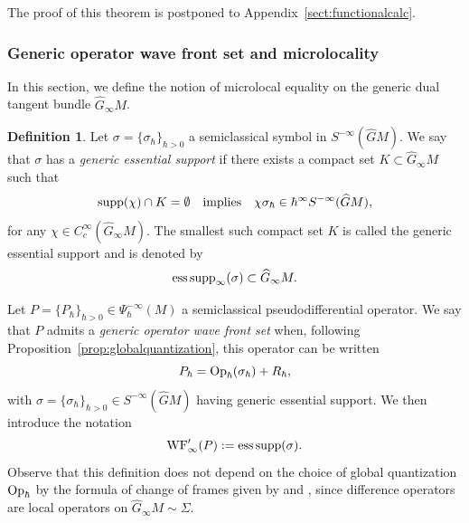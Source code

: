 \documentclass[12pt,a4paper]{amsart}
\theoremstyle{plain}
\theoremstyle{definition}
\newtheorem{definition}[theorem]{Definition}
\theoremstyle{remark}
\numberwithin{equation}{section}
\theoremstyle{definition}
\def \Op{{\rm Op}}
\def \Ghat{\widehat{G}}
\numberwithin{equation}{section}
\begin{document}
The proof of this theorem is postponed to Appendix~\ref{sect:functionalcalc}.

\subsubsection{Generic operator wave front set and microlocality}
\label{subsubsect:wavefrontset}

In this section, we define the notion of microlocal equality on the generic dual tangent bundle $\Ghat_\infty M$.

\begin{definition}
    \label{def:esssup}
    Let $\sigma = \{\sigma_\hbar\}_{\hbar>0}$ a semiclassical symbol in $S^{-\infty}(\Ghat M)$. We say that $\sigma$ has a \emph{generic essential support} if there exists a compact set $K\subset \Ghat_\infty M$ such that
    \begin{equation*}
        {\rm supp}(\chi)\cap K = \emptyset\quad\mbox{implies}\quad\chi\sigma_\hbar\in\hbar^\infty S^{-\infty}(\Ghat M),
    \end{equation*}
    for any $\chi\in C_c^\infty(\Ghat_\infty M)$. The smallest such compact set $K$ is called the generic essential support and is denoted by
    \begin{equation*}
        {\rm ess\,supp}_\infty(\sigma)\subset \Ghat_\infty M.
    \end{equation*}
\end{definition}

Let $P=\{P_\hbar\}_{\hbar>0}\in \Psi_\hbar^{-\infty}(M)$ a semiclassical pseudodifferential operator. We say that $P$ admits a \emph{generic operator wave front set} when, following Proposition~\ref{prop:globalquantization}, this operator can be written
\begin{equation*}
    P_\hbar = \Op_\hbar(\sigma_\hbar) + R_\hbar,
\end{equation*}
with $\sigma = \{\sigma_\hbar\}_{\hbar>0}\in S^{-\infty}(\Ghat M)$ having generic essential support. We then introduce the notation
\begin{equation}
    \label{eq:opwavefrontset}
    {\rm WF}'_\infty(P) := {\rm ess\,supp}(\sigma).
\end{equation}
Observe that this definition does not depend on the choice of global quantization $\Op_\hbar$ by the formula of change of frames given by \cite[Proposition 2.6]{BFF25} and \cite[Proposition A.5]{BFF25}, since difference operators are local operators on $\Ghat_\infty M\sim \Sigma$.
\end{document}

